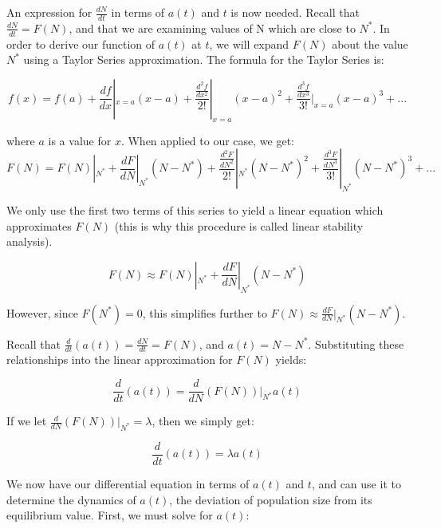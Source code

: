 \documentclass[12pt]{article}
\begin{document}
An expression for $\frac{dN}{dt}$ in terms of $a(t)$ and $t$ is now needed. Recall that $\frac{dN}{dt} = F(N)$, and that we are examining values of N which are close to $N^{*}$. In order to derive our function of $a(t)$ at $t$, we will expand $F(N)$ about the value $N^{*}$ using a Taylor Series approximation. The formula for the Taylor Series is:

\begin{equation}
f(x) = f(a) + \frac{df}{dx}|_{x=a}(x-a) + \frac{\frac{d^{2}f}{dx^{2}}}{2!}|_{x=a}(x-a)^{2} + \frac{\frac{d^{3}f}{dx^{3}}}{3!}|_{x=a}(x-a)^{3} + ...
\end{equation}

where $a$ is a value for $x$. When applied to our case, we get:
\begin{equation}
F(N) = F(N)|_{N^{*}} + \frac{dF}{dN}|_{N^{*}}(N-N^{*}) + \frac{\frac{d^{2}F}{dN^{2}}}{2!}|_{N^{*}}(N-N^{*})^{2} + \frac{\frac{d^{3}F}{dN^{3}}}{3!}|_{N^{*}}(N-N^{*})^{3} + ...
\end{equation}

We only use the first two terms of this series to yield a linear equation which approximates $F(N)$ (this is why this procedure is called linear stability analysis).

\begin{equation}
F(N) \approx F(N)|_{N^{*}} + \frac{dF}{dN}|_{N^{*}}(N-N^{*})
\end{equation}

However, since $F(N^{*}) = 0$, this simplifies further to $F(N) \approx \frac{dF}{dN}|_{N^{*}}(N-N^{*})$.

Recall that $\frac{d}{dt}(a(t)) = \frac{dN}{dt} = F(N)$, and $a(t) = N - N^{*}$. Substituting these relationships into the linear approximation for $F(N)$ yields:

\begin{equation}
\frac{d}{dt}(a(t)) = \frac{d}{dN}(F(N))|_{N^{*}}a(t)
\end{equation}

If we let $\frac{d}{dN}(F(N))|_{N^{*}} = \lambda$, then we simply get:

\begin{equation}
\frac{d}{dt}(a(t)) = \lambda a(t)
\end{equation}

We now have our differential equation in terms of $a(t)$ and $t$, and can use it to determine the dynamics of $a(t)$, the deviation of population size from its equilibrium value. First, we must solve for $a(t)$:
\end{document}
